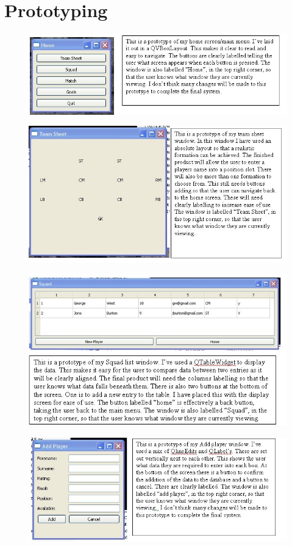 \section{Prototyping}
\begin{figure}[H]
	\includegraphics[width=150mm]{HomePT}
\end{figure}
\begin{figure}[H]
	\includegraphics[width=150mm]{TeamSheetPT}
\end{figure}
\begin{figure}[H]
	\includegraphics[width=150mm]{SquadPT}
\end{figure}
\begin{figure}[H]
	\includegraphics[width=150mm]{AddPlayerPT}
\end{figure}

